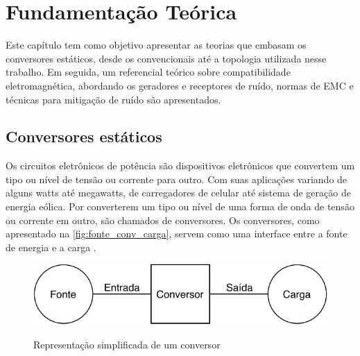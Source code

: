 \chapter{Fundamentação Teórica} \label{cap:fund}
    
    Este capítulo tem como objetivo apresentar as teorias que embasam os conversores estáticos, desde os convencionais até a topologia utilizada nesse trabalho. Em seguida, um referencial teórico sobre compatibilidade eletromagnética, abordando os geradores e receptores de ruído, normas de EMC e técnicas para mitigação de ruído são apresentados. 
    
    \section{Conversores estáticos} \label{cap:fund_elp}
        
        Os circuitos eletrônicos de potência são dispositivos eletrônicos que convertem um tipo ou nível de tensão ou corrente para outro. Com suas aplicações variando de alguns watts até megawatts, de carregadores de celular até sistema de geração de energia eólica. Por converterem um tipo ou nível de uma forma de onda de tensão ou corrente em outro, são chamados de conversores. Os conversores, como apresentado na \autoref{fig:fonte_conv_carga}, servem como uma interface entre a fonte de energia e a carga \cite{ref:ELP_livro_Hart}.
        
        \begin{figure}[H]
        	\centering
        	\caption{Representação simplificada de um conversor}
        	\includegraphics[scale=1]{pdf/outros/fonte_conver_carga.pdf}
        	\label{fig:fonte_conv_carga}
        \end{figure}
        
